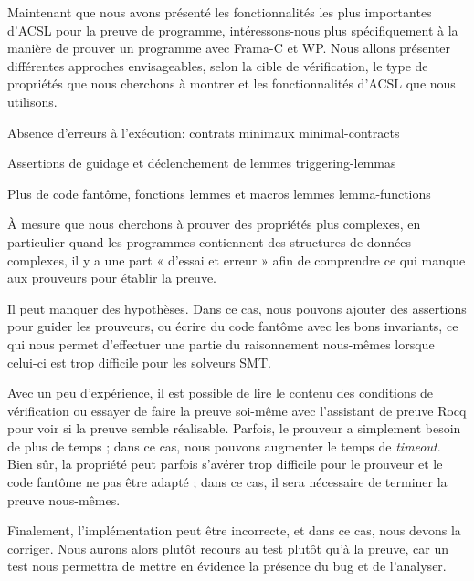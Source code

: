 Maintenant que  nous avons présenté les fonctionnalités les plus importantes
d'ACSL pour la preuve de programme, intéressons-nous plus spécifiquement à la
manière de prouver un programme avec Frama-C et WP. Nous allons présenter
différentes approches envisageables, selon la cible de vérification,
le type de propriétés que nous cherchons à montrer et les fonctionnalités d'ACSL
que nous utilisons.


\begin{levelTwo}
  {Absence d'erreurs à l'exécution: contrats minimaux}
  {minimal-contracts}
\end{levelTwo}

\begin{levelTwo}
  {Assertions de guidage et déclenchement de lemmes}
  {triggering-lemmas}
\end{levelTwo}

\begin{levelTwo}
  {Plus de code fantôme, fonctions lemmes et macros lemmes}
  {lemma-functions}
\end{levelTwo}



\horizontalLine
\newpage


À mesure que nous cherchons à prouver des propriétés plus complexes,
en particulier quand les programmes contiennent des
structures de données complexes, il y a une part « d'essai et erreur »
afin de comprendre ce qui manque aux prouveurs pour établir la preuve.


Il peut manquer des hypothèses. Dans ce cas, nous pouvons ajouter
des assertions pour guider les prouveurs, ou écrire du code fantôme avec les
bons invariants, ce qui nous permet d'effectuer une partie du raisonnement
nous-mêmes lorsque celui-ci est trop difficile pour les solveurs SMT.


Avec un peu d'expérience, il est possible de lire le contenu des
conditions de vérification ou essayer de faire la preuve soi-même avec
l'assistant de preuve Rocq pour voir si la preuve semble réalisable.
Parfois, le prouveur a simplement besoin de plus de temps ; dans ce cas, nous
pouvons augmenter le temps de \textit{timeout}. Bien sûr, la propriété peut
parfois s'avérer trop difficile pour le prouveur et le code fantôme ne pas
être adapté ; dans ce cas, il sera nécessaire de terminer la preuve nous-mêmes.


Finalement, l'implémentation peut être incorrecte, et dans ce cas,
nous devons la corriger. Nous aurons alors plutôt recours au test plutôt
qu'à la preuve, car un test nous permettra de mettre en évidence la
présence du bug et de l'analyser.
